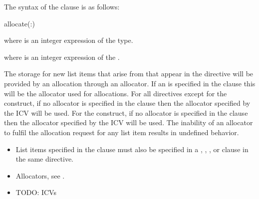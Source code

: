 \syntax

The syntax of the  clause is as follows:

\begin{boxedcode}
allocate(\plc{[allocator}:\plc{] list})
\end{boxedcode}

\begin{ccppspecific}
where  is an integer expression of the  type.
\end{ccppspecific}
\begin{fortranspecific}
where  is an integer expression of the  .
\end{fortranspecific}

\descr

The storage for new list items that arise from  that appear in the directive will be provided by an allocation through an allocator. If an  is specified in the clause this will be the allocator used for allocations. For all directives except for the  construct, if no allocator is specified in the clause then the allocator specified by the  ICV will be used. For the  construct, if no allocator is specified in the clause then the allocator specified by the  ICV will be used.  The inability of an allocator to fulfil the allocation request for any list item results in undefined behavior.

\restrictions
\begin{itemize}
\item List items specified in the  clause must also be specified in a , , ,  or
       clause in the same directive.
\end{itemize}

\crossreferences
\begin{itemize}
\item Allocators, see .
\item TODO: ICVs
\end{itemize}
